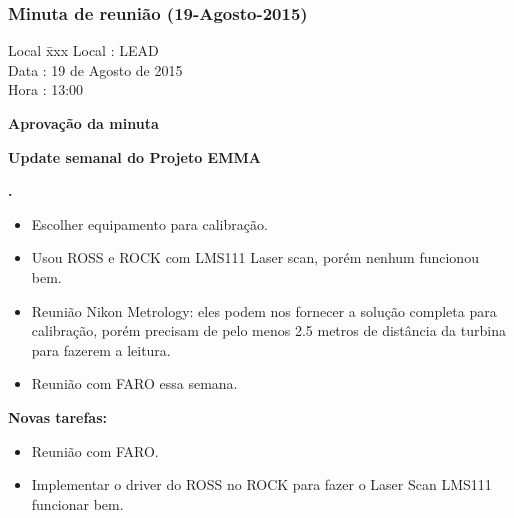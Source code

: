 \subsubsection{Minuta de reunião (19-Agosto-2015)}

\begin{tabbing}
  Local \= xxx \kill
  Local \> : LEAD \\
  Data  \> : 19 de Agosto de 2015 \\
  Hora  \> : 13:00
\end{tabbing}


\textbf{Aprovação da minuta}

\textbf{Update semanal do Projeto EMMA}
   							
					
\textbf{\gabriel.} 
	\begin{itemize}
		\item Escolher equipamento para calibração.
				\item Usou ROSS e ROCK com LMS111 Laser scan, porém nenhum funcionou bem.
				\item Reunião Nikon Metrology: eles podem nos fornecer a solução completa
				para calibração, porém precisam de pelo menos 2.5 metros de distância da
				turbina para fazerem a leitura.
				\item Reunião com FARO essa semana.
			\end{itemize}
		
		\item \textbf{Novas tarefas:}
			\begin{itemize} 
				\item Reunião com FARO.
				\item Implementar o driver do ROSS no ROCK para fazer o Laser Scan LMS111
				funcionar bem.
			\end{itemize}

					
			
